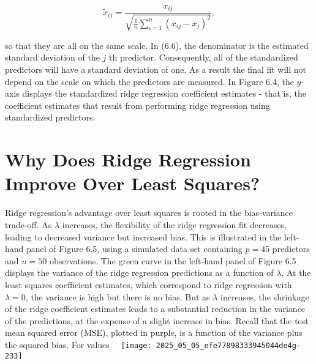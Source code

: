 \documentclass[10pt]{article}
\begin{document}
\begin{equation*}
\tilde{x}_{i j}=\frac{x_{i j}}{\sqrt{\frac{1}{n} \sum_{i=1}^{n}\left(x_{i j}-\bar{x}_{j}\right)^{2}}}, \tag{6.6}
\end{equation*}


so that they are all on the same scale. In (6.6), the denominator is the estimated standard deviation of the $j$ th predictor. Consequently, all of the standardized predictors will have a standard deviation of one. As a result the final fit will not depend on the scale on which the predictors are measured. In Figure 6.4, the $y$-axis displays the standardized ridge regression coefficient estimates - that is, the coefficient estimates that result from performing ridge regression using standardized predictors.

\section*{Why Does Ridge Regression Improve Over Least Squares?}
Ridge regression's advantage over least squares is rooted in the bias-variance trade-off. As $\lambda$ increases, the flexibility of the ridge regression fit decreases, leading to decreased variance but increased bias. This is illustrated in the left-hand panel of Figure 6.5, using a simulated data set containing $p=45$ predictors and $n=50$ observations. The green curve in the left-hand panel of Figure 6.5 displays the variance of the ridge regression predictions as a function of $\lambda$. At the least squares coefficient estimates, which correspond to ridge regression with $\lambda=0$, the variance is high but there is no bias. But as $\lambda$ increases, the shrinkage of the ridge coefficient estimates leads to a substantial reduction in the variance of the predictions, at the expense of a slight increase in bias. Recall that the test mean squared error (MSE), plotted in purple, is a function of the variance plus the squared bias. For values\
\
\texttt{[image: 2025\_05\_05\_efe77898333945044de4g-233]}
\end{document}
